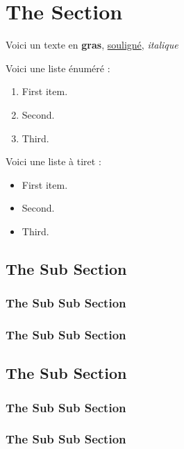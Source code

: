 \section{The Section}

Voici un texte en \textbf{gras}, \underline{souligné}, \textit{italique}

Voici une liste énuméré :
\begin{enumerate}
    \item First item.
    \item Second.
    \item Third.
\end{enumerate}

Voici une liste à tiret :

\begin{itemize}
    \item First item.
    \item Second.
    \item Third.
\end{itemize}


\subsection{The Sub Section}

\blindtext

\subsubsection{The Sub Sub Section}

\blindtext

\subsubsection{The Sub Sub Section}

\blindtext

\subsection{The Sub Section}

\blindtext

\subsubsection{The Sub Sub Section}

\blindtext

\subsubsection{The Sub Sub Section}

\blindtext
